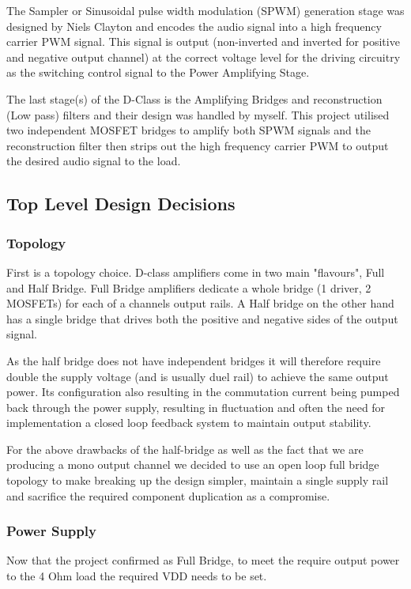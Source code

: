 \documentclass[11pt]{article}
\begin{document}
{The Sampler or Sinusoidal pulse width modulation (SPWM) generation stage was designed by Niels Clayton and encodes the audio signal into a high frequency carrier PWM signal. This signal is output (non-inverted and inverted for positive and negative output channel) at the correct voltage level for the driving circuitry as the switching control signal to the Power Amplifying Stage.

The last stage(s) of the D-Class is the Amplifying Bridges and reconstruction (Low pass) filters and their design was handled by myself. This project utilised two independent MOSFET bridges to amplify both SPWM signals and the reconstruction filter then strips out the high frequency carrier PWM to output the desired audio signal to the load.  

\subsection{Top Level Design Decisions}
\subsubsection*{Topology}
First is a topology choice. D-class amplifiers come in two main "flavours", Full and Half Bridge. Full Bridge amplifiers dedicate a whole bridge (1 driver, 2 MOSFETs) for each of a channels output rails. A Half bridge on the other hand has a single bridge that drives both the positive and negative sides of the output signal.

As the half bridge does not have independent bridges it will therefore require double the supply voltage (and is usually duel rail) to achieve the same output power. Its configuration also resulting in the commutation current being pumped back through the power supply, resulting in fluctuation and often the need for implementation a closed loop feedback system to maintain output stability. 

For the above drawbacks of the half-bridge as well as the fact that we are producing a mono output channel we decided to use an open loop full bridge topology to make breaking up the design simpler, maintain a single supply rail and sacrifice the required component duplication as a compromise. 

\subsubsection*{Power Supply}

Now that the project confirmed as Full Bridge, to meet the require output power to the 4 Ohm load the required VDD needs to be set.

}
\end{document}

